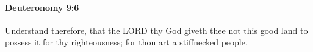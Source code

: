 
		\paragraph{Deuteronomy 9:6} %
			\label{DEUTERONOMY-9-6}

			Understand therefore, that the LORD thy God giveth thee not this good land to possess it for thy righteousness; for thou art a stiffnecked people.


